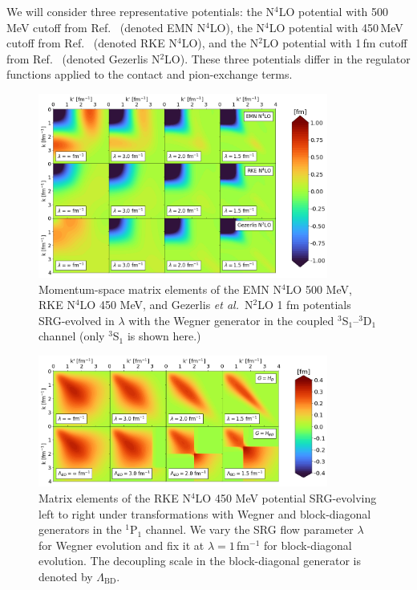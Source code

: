 \documentclass[10pt,aps,prc,floatfix,twocolumn,nofootinbib]{revtex4-1}
\newcommand{\LambdaBD}{{\Lambda_{\text{BD}}}}
\begin{document}
We will consider three representative potentials: the N$^4$LO potential with 500\,MeV cutoff from Ref.~\cite{Entem:2017gor} (denoted EMN N$^4$LO), the N$^4$LO potential with 450\,MeV cutoff from Ref.~\cite{Reinert:2017usi} (denoted RKE N$^4$LO), and the N$^2$LO potential with 1\,fm cutoff from Ref.~\cite{Gezerlis:2014zia} (denoted Gezerlis N$^2$LO).
These three potentials differ in the regulator functions applied to the contact and pion-exchange terms. 

%
\begin{figure}[htb]
	\includegraphics[clip,width=0.85\textwidth]{potential_contours_3S1_Wegner_kvnns_79_111_222.png}%
	\caption{Momentum-space matrix elements of the EMN N$^4$LO 500 MeV, RKE N$^4$LO 450 MeV, and Gezerlis \textit{et al.}~N$^2$LO 1 fm potentials SRG-evolved in $\lambda$ with the Wegner generator in the coupled $^3$S$_1$--$^3$D$_1$ channel (only $^3$S$_1$ is shown here.)}
	\label{fig:potential_contours_3S1_Wegner}
\end{figure}
%
\begin{figure}[tbh]
    \includegraphics[clip,width=0.85\textwidth]{potential_contours_kvnn_111_1P1_generators_Wegner_Block-diag.png}%
	\caption{Matrix elements of the RKE N$^4$LO 450 MeV potential SRG-evolving left to right under transformations with Wegner and block-diagonal generators in the $^1$P$_1$ channel. We vary the SRG flow parameter $\lambda$ for Wegner evolution and fix it at $\lambda=1$\,fm$^{-1}$ for block-diagonal evolution. The decoupling scale in the block-diagonal generator is denoted by $\LambdaBD$.}
	\label{fig:potential_contours_1P1_RKE}
\end{figure}
\end{document}
